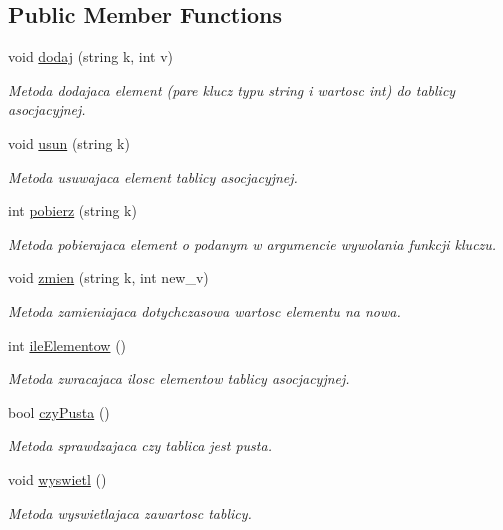 \subsection*{\-Public \-Member \-Functions}
\begin{DoxyCompactItemize}
\item 
void \hyperlink{classtablica__asoc_abdae1d4f67eb422e59045a8b75d0d0a1}{dodaj} (string k, int v)
\begin{DoxyCompactList}\small\item\em \-Metoda dodajaca element (pare klucz typu string i wartosc int) do tablicy asocjacyjnej. \end{DoxyCompactList}\item 
void \hyperlink{classtablica__asoc_a4e9dfb13a9c37ce837763e34272afe26}{usun} (string k)
\begin{DoxyCompactList}\small\item\em \-Metoda usuwajaca element tablicy asocjacyjnej. \end{DoxyCompactList}\item 
int \hyperlink{classtablica__asoc_ada9b8ff8ef7473130cff88bba5cae391}{pobierz} (string k)
\begin{DoxyCompactList}\small\item\em \-Metoda pobierajaca element o podanym w argumencie wywolania funkcji kluczu. \end{DoxyCompactList}\item 
void \hyperlink{classtablica__asoc_a8d076bc8d242a51350eaa0d2b48fce45}{zmien} (string k, int new\-\_\-v)
\begin{DoxyCompactList}\small\item\em \-Metoda zamieniajaca dotychczasowa wartosc elementu na nowa. \end{DoxyCompactList}\item 
int \hyperlink{classtablica__asoc_a826a82ad432aa764e0123148432ae856}{ile\-Elementow} ()
\begin{DoxyCompactList}\small\item\em \-Metoda zwracajaca ilosc elementow tablicy asocjacyjnej. \end{DoxyCompactList}\item 
\hypertarget{classtablica__asoc_ab7e21787979b96508788f5b332fda722}{bool \hyperlink{classtablica__asoc_ab7e21787979b96508788f5b332fda722}{czy\-Pusta} ()}\label{classtablica__asoc_ab7e21787979b96508788f5b332fda722}

\begin{DoxyCompactList}\small\item\em \-Metoda sprawdzajaca czy tablica jest pusta. \end{DoxyCompactList}\item 
void \hyperlink{classtablica__asoc_afa708ebc355ff46308daffa4e4189a7a}{wyswietl} ()
\begin{DoxyCompactList}\small\item\em \-Metoda wyswietlajaca zawartosc tablicy. \end{DoxyCompactList}\end{DoxyCompactItemize}


